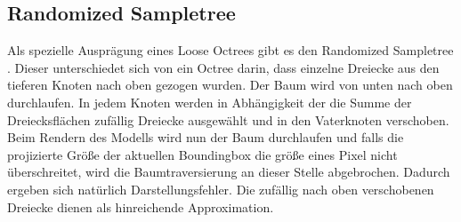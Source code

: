 \subsection{Randomized Sampletree}
\label{sec:basics:sampletree}
Als spezielle Ausprägung eines Loose Octrees gibt es den Randomized Sampletree \cite{klein}. Dieser unterschiedet sich von ein Octree darin, dass einzelne Dreiecke aus den tieferen Knoten nach oben gezogen wurden. Der Baum wird von unten nach oben durchlaufen. In jedem Knoten werden in Abhängigkeit der die Summe der Dreiecksflächen zufällig Dreiecke ausgewählt und in den Vaterknoten verschoben. Beim Rendern des Modells wird nun der Baum durchlaufen und falls die projizierte Größe der aktuellen Boundingbox die größe eines Pixel nicht überschreitet, wird die Baumtraversierung an dieser Stelle abgebrochen. Dadurch ergeben sich natürlich Darstellungsfehler. 
%
Die zufällig nach oben verschobenen Dreiecke dienen als hinreichende Approximation. 


